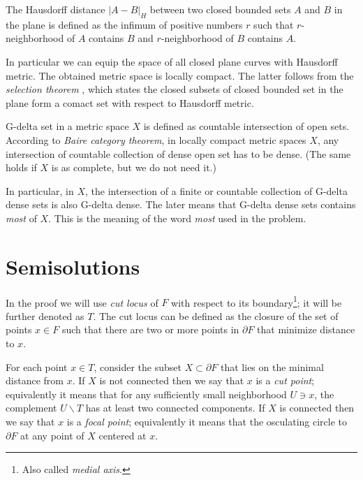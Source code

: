 The Hausdorff distance $|A-B|_H$ between two closed bounded sets $A$ and $B$ in the plane is defined as the infimum of positive numbers $r$ such that $r$-neighborhood of $A$ contains $B$ and $r$-neighborhood of $B$ contains $A$.

In particular we can equip the space of all closed plane curves with Hausdorff metric.
The obtained metric space is locally compact.
The latter follows from the \emph{selection theorem} \cite[see \S18 in][]{blaschke},
which states the closed subsets of closed bounded set in the plane form a comact set with respect to Hausdorff metric. 

G-delta set in a metric space $X$ is defined as countable intersection of open sets.
According to \emph{Baire category theorem}, 
in locally compact metric spaces $X$,
any intersection of countable collection of dense open set 
has to be dense.
(The same holds if $X$ is as complete, but we do not need it.)

In particular, in $X$, 
the intersection of a finite or countable collection of G-delta dense sets is also G-delta dense. 
The later means that G-delta dense sets contains {}\emph{most} of $X$. 
This is the meaning of the word {}\emph{most} used in the problem.



\section*{Semisolutions}


In the proof we will use \emph{cut locus}
of $F$ with respect to its boundary\footnote{Also called \emph{medial axis}.};
it will be further denoted as $T$.
The cut locus can be defined as the closure
of the set of points $x\in F$ 
such that there are two or more points in $\partial F$ that minimize distance to $x$.



For each point $x\in T$, consider the subset $X\subset\partial F$ that lies on the minimal distance from $x$.
If $X$ is not connected then we say that $x$ is a \emph{cut point};
equivalently it means that for any sufficiently small neighborhood $U\ni x$, 
the complement $U\backslash T$ has at least two connected components.
If $X$ is connected 
then we say that $x$ is a \emph{focal point};
equivalently it means that the osculating circle to $\partial F$ at any point of $X$ centered at $x$.


